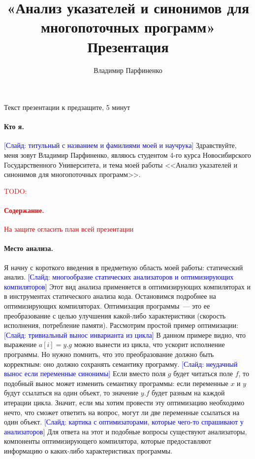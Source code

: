 \documentclass[12pt]{article}
\title{
  «Анализ указателей и синонимов для многопоточных программ»\\
  Презентация
}
\author{
  Владимир Парфиненко
}
\newcommand{\todo}[1]{\textcolor{red}{TODO: #1}}
\newcommand{\slide}[1]{\textcolor{Blue}{[Слайд: #1]}}
\begin{document}
  {\Large Текст презентации к предзащите, 5 минут}
  \vspace{5mm}

  \paragraph{Кто я.}
  \slide{титульный с названием и фамилиями моей и научрука}
  Здравствуйте, меня зовут Владимир Парфиненко, являюсь студентом 4-го
  курса Новосибирского Государственного Университета, и тема моей работы
  <<Анализ указателей и синонимов для многопоточных программ>>.

  \todo{\paragraph{Содержание.} На защите огласить план всей презентации}

  \paragraph{Место анализа.}
  Я начну с короткого введения в предметную область моей работы: статический
  анализ.
  \slide{многообразие статических анализаторов и оптимизирующих компиляторов}
  Этот вид анализа применяется в оптимизирующих компиляторах и в инструментах
  статического анализа кода.  Остановимся подробнее на оптимизирующих
  компиляторах.
  Оптимизация программы~--- это ее преобразование с целью улучшения какой-либо
  характеристики (скорость исполнения, потребление памяти). Рассмотрим простой
  пример оптимизации: \slide{тривиальный вынос инварианта из цикла}
  В данном примере видно, что выражение $a[i] = y.g$ можно вынести из цикла,
  что ускорит исполнение программы. Но нужно помнить, что это преобразование
  должно быть корректным: оно должно сохранять семантику программу.
  \slide{неудачный вынос если переменные синонимы}
  Если вместо поля $g$ будет читаться поле $f$, то подобный вынос может
  изменить семантику программы: если переменные $x$ и $y$ будут ссылаться на
  один объект, то значение $y.f$ будет разным на каждой итерации цикла.
  Значит, если мы хотим провести эту оптимизацию необходимо нечто, что
  сможет ответить на вопрос, могут ли две переменные ссылаться на один объект.
  \slide{картика с оптимизаторами, которые чего-то спрашивают у анализаторов}
  Для ответа на этот и подобные вопросы существуют
  анализаторы, компоненты оптимизирующего компилятора, которые предоставляют
  информацию о каких-либо характеристиках программы.
\end{document}
